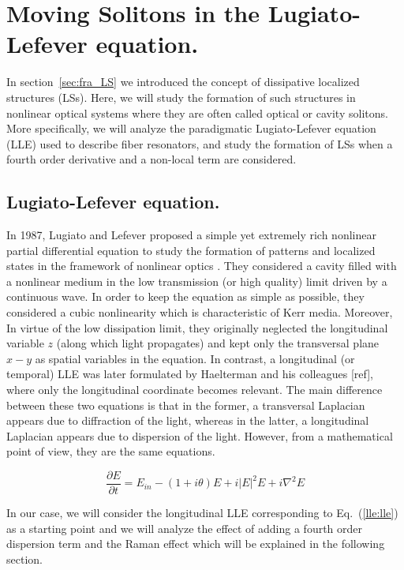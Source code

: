 \chapter{Moving Solitons in the Lugiato-Lefever equation.}



In section~\ref{sec:fra_LS} we introduced the concept of dissipative localized structures (LSs). Here, we will study the formation
of such structures in nonlinear optical systems where they are often called optical or cavity solitons. 
More specifically, we will analyze the paradigmatic Lugiato-Lefever equation (LLE) \cite{lugiatolefever1987} used to describe fiber resonators, and
study the formation of LSs when a fourth order derivative and a non-local term are considered.


\section{Lugiato-Lefever equation.}

In 1987, Lugiato and Lefever proposed a simple yet extremely rich nonlinear partial differential equation to study the formation of patterns and localized states
in the framework of nonlinear optics \cite{lugiatolefever1987}. They considered a cavity filled with a nonlinear medium in the low transmission (or high quality) limit
driven by a continuous wave. In order to keep the equation as simple as possible, they considered a cubic nonlinearity which is characteristic of Kerr media. Moreover,
In virtue of the low dissipation limit, they originally neglected the longitudinal variable $z$ (along which light propagates) and kept only the transversal plane $x-y$ as spatial
variables in the equation. In contrast, a longitudinal (or temporal) LLE was later formulated by Haelterman and his colleagues [ref], where only the longitudinal 
coordinate becomes relevant. The main difference between these two equations is that in the former, a transversal Laplacian appears due to diffraction of the light, whereas
in the latter, a longitudinal Laplacian appears due to dispersion of the light. However, from a mathematical point of view, they are the same equations.


\begin{equation}
    \dfrac{\partial E}{\partial t} = E_{in} - (1 + i\theta) E + i |E|^2 E + i\nabla^2 E
    \label{lle:lle}
\end{equation}

In our case, we will consider the longitudinal LLE corresponding to Eq.~(\ref{lle:lle}) as a starting point and we will analyze
the effect of adding a fourth order dispersion term and the Raman effect which will be explained in the following section.

